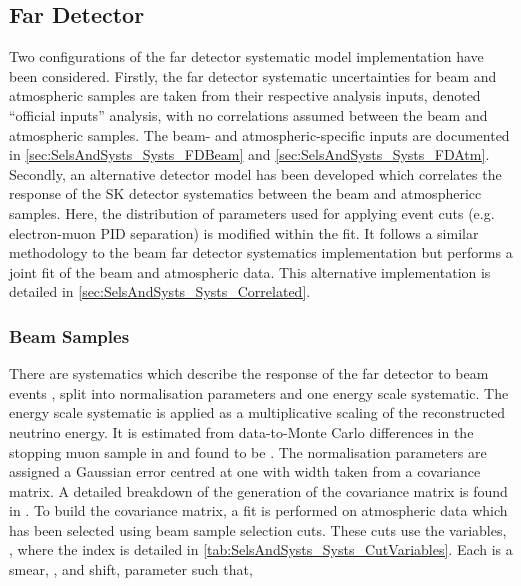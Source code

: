 \subsection{Far Detector}
\label{sec:SelsAndSysts_Systs_FD}

Two configurations of the far detector systematic model implementation have been considered. Firstly, the far detector systematic uncertainties for beam and atmospheric samples are taken from their respective analysis inputs, denoted ``official inputs'' analysis, with no correlations assumed between the beam and atmospheric samples. The beam- and atmospheric-specific inputs are documented in \autoref{sec:SelsAndSysts_Systs_FDBeam} and \autoref{sec:SelsAndSysts_Systs_FDAtm}. Secondly, an alternative detector model has been developed which correlates the response of the SK detector systematics between the beam and atmosphericc samples. Here, the distribution of parameters used for applying event cuts (e.g. electron-muon PID separation) is modified within the fit. It follows a similar methodology to the beam far detector systematics implementation but performs a joint fit of the beam and atmospheric data. This alternative implementation is detailed in \autoref{sec:SelsAndSysts_Systs_Correlated}.

\subsubsection{Beam Samples}
\label{sec:SelsAndSysts_Systs_FDBeam}


There are  systematics which describe the response of the far detector to beam events \cite{t2k_tn_399}, split into  normalisation parameters and one energy scale systematic. The energy scale systematic is applied as a multiplicative scaling of the reconstructed neutrino energy. It is estimated from data-to-Monte Carlo differences in the stopping muon sample in \cite{sk_2017} and found to be . The normalisation parameters are assigned a Gaussian error centred at one with width taken from a covariance matrix. A detailed breakdown of the generation of the covariance matrix is found in \cite{t2k_tn_318}. To build the covariance matrix, a fit is performed on atmospheric data which has been selected using beam sample selection cuts. These cuts use the variables, , where the index  is detailed in \autoref{tab:SelsAndSysts_Systs_CutVariables}. Each  is a smear, \quickmath{\alpha}, and shift, \quickmath{\beta} parameter such that,

